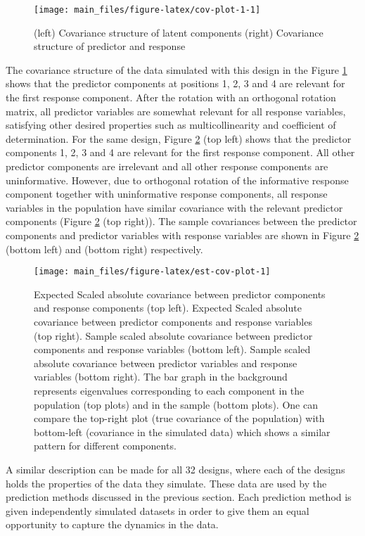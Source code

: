 \documentclass[review]{elsarticle}
\begin{document}
\begin{figure}
\texttt{[image: main\_files/figure-latex/cov-plot-1-1]} \caption{(left) Covariance structure of latent components (right) Covariance structure of predictor and response}\label{fig:cov-plot-1}
\end{figure}

The covariance structure of the data simulated with this design in the Figure \ref{fig:cov-plot-1} shows that the predictor components at positions 1, 2, 3 and 4 are relevant for the first response component. After the rotation with an orthogonal rotation matrix, all predictor variables are somewhat relevant for all response variables, satisfying other desired properties such as multicollinearity and coefficient of determination. For the same design, Figure \ref{fig:est-cov-plot} (top left) shows that the predictor components 1, 2, 3 and 4 are relevant for the first response component. All other predictor components are irrelevant and all other response components are uninformative. However, due to orthogonal rotation of the informative response component together with uninformative response components, all response variables in the population have similar covariance with the relevant predictor components (Figure \ref{fig:est-cov-plot} (top right)). The sample covariances between the predictor components and predictor variables with response variables are shown in Figure \ref{fig:est-cov-plot} (bottom left) and (bottom right) respectively.



\begin{figure}
\texttt{[image: main\_files/figure-latex/est-cov-plot-1]} \caption{Expected Scaled absolute covariance between predictor components and response components (top left). Expected Scaled absolute covariance between predictor components and response variables (top right). Sample scaled absolute covariance between predictor components and response variables (bottom left). Sample scaled absolute covariance between predictor variables and response variables (bottom right). The bar graph in the background represents eigenvalues corresponding to each component in the population (top plots) and in the sample (bottom plots). One can compare the top-right plot (true covariance of the population) with bottom-left (covariance in the simulated data) which shows a similar pattern for different components.}\label{fig:est-cov-plot}
\end{figure}

A similar description can be made for all 32 designs, where each of the designs holds the properties of the data they simulate. These data are used by the prediction methods discussed in the previous section. Each prediction method is given independently simulated datasets in order to give them an equal opportunity to capture the dynamics in the data.
\end{document}
